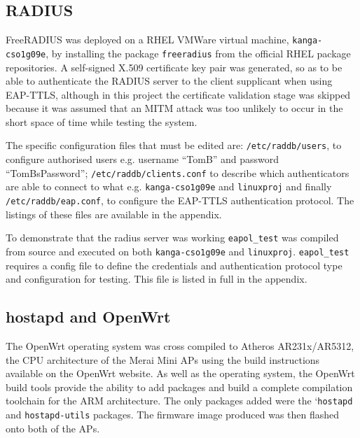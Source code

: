 \documentclass[pdftex, 12pt, a4paper]{article}
\begin{document}
\subsection{RADIUS}
FreeRADIUS was deployed on a RHEL VMWare virtual machine, \verb`kanga-cso1g09e`, by installing the package \verb`freeradius` from the official RHEL package repositories.  A self-signed X.509 certificate key pair was generated, so as to be able to authenticate the RADIUS server to the client supplicant when using EAP-TTLS, although in this project the certificate validation stage was skipped because it was assumed that an MITM attack was too unlikely to occur in the short space of time while testing the system.


The specific configuration files that must be edited are: \verb`/etc/raddb/users`, to configure authorised users e.g. username ``TomB'' and password ``TomBsPassword''; \verb`/etc/raddb/clients.conf` to describe which authenticators are able to connect to what e.g. \verb`kanga-cso1g09e` and \verb`linuxproj` and finally \verb`/etc/raddb/eap.conf`, to configure the EAP-TTLS authentication protocol.  The listings of these files are available in the appendix.

To demonstrate that the radius server was working \verb`eapol_test` was compiled from source and executed on both \verb`kanga-cso1g09e` and \verb`linuxproj`.  \verb`eapol_test` requires a config file to define the credentials and authentication protocol type and configuration for testing. This file is listed in full in the appendix.

\subsection{hostapd and OpenWrt}
The OpenWrt operating system was cross compiled to Atheros AR231x/AR5312, the CPU architecture of the Merai Mini APs using the build instructions available on the OpenWrt website\cite{openwrt-build}. As well as the operating system, the OpenWrt build tools provide the ability to add packages and build a complete compilation toolchain for the ARM architecture.  The only packages added were the `\verb`hostapd` and \verb`hostapd-utils` packages.  The firmware image produced was then flashed onto both of the APs.

\end{document}
